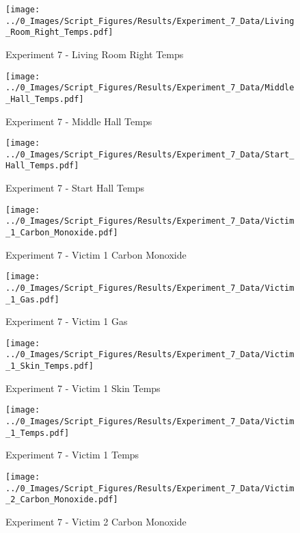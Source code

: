	\clearpage

	\begin{figure}[H]
		\centering
		\texttt{[image: ../0\_Images/Script\_Figures/Results/Experiment\_7\_Data/Living\_Room\_Right\_Temps.pdf]}
		\caption[]{Experiment 7 - Living Room Right Temps}
	\end{figure}
 

	\begin{figure}[H]
		\centering
		\texttt{[image: ../0\_Images/Script\_Figures/Results/Experiment\_7\_Data/Middle\_Hall\_Temps.pdf]}
		\caption[]{Experiment 7 - Middle Hall Temps}
	\end{figure}
 
	\clearpage

	\begin{figure}[H]
		\centering
		\texttt{[image: ../0\_Images/Script\_Figures/Results/Experiment\_7\_Data/Start\_Hall\_Temps.pdf]}
		\caption[]{Experiment 7 - Start Hall Temps}
	\end{figure}
 

	\begin{figure}[H]
		\centering
		\texttt{[image: ../0\_Images/Script\_Figures/Results/Experiment\_7\_Data/Victim\_1\_Carbon\_Monoxide.pdf]}
		\caption[]{Experiment 7 - Victim 1 Carbon Monoxide}
	\end{figure}
 
	\clearpage

	\begin{figure}[H]
		\centering
		\texttt{[image: ../0\_Images/Script\_Figures/Results/Experiment\_7\_Data/Victim\_1\_Gas.pdf]}
		\caption[]{Experiment 7 - Victim 1 Gas}
	\end{figure}
 

	\begin{figure}[H]
		\centering
		\texttt{[image: ../0\_Images/Script\_Figures/Results/Experiment\_7\_Data/Victim\_1\_Skin\_Temps.pdf]}
		\caption[]{Experiment 7 - Victim 1 Skin Temps}
	\end{figure}
 
	\clearpage

	\begin{figure}[H]
		\centering
		\texttt{[image: ../0\_Images/Script\_Figures/Results/Experiment\_7\_Data/Victim\_1\_Temps.pdf]}
		\caption[]{Experiment 7 - Victim 1 Temps}
	\end{figure}
 

	\begin{figure}[H]
		\centering
		\texttt{[image: ../0\_Images/Script\_Figures/Results/Experiment\_7\_Data/Victim\_2\_Carbon\_Monoxide.pdf]}
		\caption[]{Experiment 7 - Victim 2 Carbon Monoxide}
	\end{figure}
 
